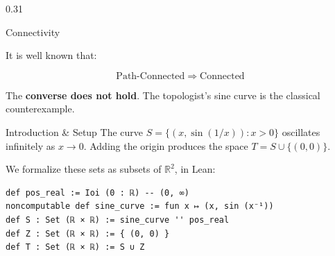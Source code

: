 \documentclass{beamer}
\begin{document}
\begin{frame}[t,fragile]
\begin{columns}[t]
\begin{column}{0.31\textwidth}
\begin{block}{Connectivity}
\begin{minipage}[t]{0.47\linewidth}
                \end{minipage}

                \vspace{1.2em}

                It is well known that:


                $$
                    \text{Path-Connected} \;\Rightarrow\; \text{Connected}
                $$


                The \textbf{converse does not hold}. The topologist's sine curve is the classical counterexample.
            \end{block}

            \begin{block}{Introduction \& Setup}
                The curve $S = \{(x,\sin(1/x)) : x > 0\}$ oscillates infinitely as $x \to 0$.
                Adding the origin produces the space $T = S \cup \{(0,0)\}$.

                We formalize these sets as subsets of $\mathbb{R}^2$, in Lean:

                \begin{lstlisting}
def pos_real := Ioi (0 : ℝ) -- (0, ∞)
noncomputable def sine_curve := fun x ↦ (x, sin (x⁻¹))
def S : Set (ℝ × ℝ) := sine_curve '' pos_real
def Z : Set (ℝ × ℝ) := { (0, 0) }
def T : Set (ℝ × ℝ) := S ∪ Z
    \end{lstlisting}

                \begin{figure}
                    \centering
\end{figure}
\end{block}
\end{column}
\end{columns}
\end{frame}
\end{document}
